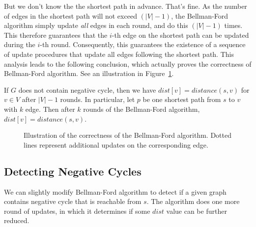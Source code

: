 But we don't know the the shortest path in advance. That's fine.
As the number of edges in the shortest path will not exceed $(|V| - 1)$, the Bellman-Ford algorithm
simply update \emph{all} edges in each round, and do this $(|V| - 1)$ times.
This therefore guarantees that the $i$-th edge on the shortest path can be updated during the $i$-th round.
Consequently, this guarantees the existence of a sequence of update procedures that update all edges following the shortest path.
This analysis leads to the following conclusion, which actually proves the correctness of Bellman-Ford algorithm.
See an illustration in Figure~\ref{fig:bellman}.
\begin{fact}
\label{fact5}
If $G$ does not contain negative cycle,  then we have $dist[v] = distance(s,v)$ for $v\in V$ after $|V| -1$ rounds.
In particular, let $p$ be one shortest path from $s$ to $v$ with $k$ edge.  
Then after $k$ rounds of the Bellman-Ford algorithm, $dist[v] = distance(s,v)$.
\end{fact}

\begin{figure}[h]
\centering{}
\caption{Illustration of the correctness of the Bellman-Ford algorithm.
Dotted lines represent additional updates on the corresponding edge.}
\label{fig:bellman}
\end{figure}



\subsection*{Detecting Negative Cycles}

We can slightly modify Bellman-Ford algorithm to detect if a given graph contains negative cycle that is reachable from $s$.
The algorithm does one more round of updates, in which it determines if some $dist$ value can be further reduced.

\begin{minipage}{0.8\textwidth}
	\xxx
	\xxx
	\xxx
	\xxx
	\xxx
	\xxx
	\xxx
	\xxx
	\xxx
	\xxx
	\xxx
	\xxx
	\xxx
\end{minipage}


